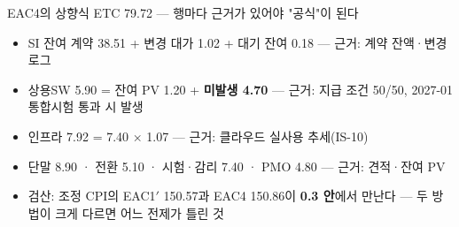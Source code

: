 \begin{frame}{EAC4의 상향식 ETC 79.72 — 행마다 근거가 있어야 "공식"이 된다}
\begin{itemize}
\item SI 잔여 계약 38.51 + 변경 대가 1.02 + 대기 잔여 0.18 — 근거: 계약 잔액·변경 로그
\item 상용SW 5.90 = 잔여 PV 1.20 + \textbf{미발생 4.70} — 근거: 지급 조건 50/50, 2027-01 통합시험 통과 시 발생
\item 인프라 7.92 = 7.40 × 1.07 — 근거: 클라우드 실사용 추세(IS-10)
\item 단말 8.90 · 전환 5.10 · 시험·감리 7.40 · PMO 4.80 — 근거: 견적·잔여 PV
\item 검산: 조정 CPI의 EAC1$'$ 150.57과 EAC4 150.86이 \textbf{0.3 안}에서 만난다 — 두 방법이 크게 다르면 어느 전제가 틀린 것
\end{itemize}
\end{frame}

